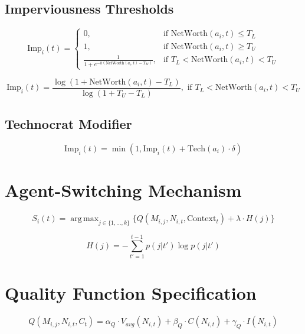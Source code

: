\documentclass[12pt, a4paper]{article}
\DeclareMathOperator*{\argmax}{arg\,max}
\begin{document}
\subsection{Imperviousness Thresholds}
\begin{equation}
\text{Imp}_i(t) = \begin{cases}
0, & \text{if } \text{NetWorth}(a_i, t) \leq T_L \\
1, & \text{if } \text{NetWorth}(a_i, t) \geq T_U \\
\frac{1}{1 + e^{-k(\text{NetWorth}(a_i, t) - T_M)}}, & \text{if } T_L < \text{NetWorth}(a_i, t) < T_U
\end{cases}
\end{equation}


\begin{equation}
\text{Imp}_i(t) = \frac{\log(1 + \text{NetWorth}(a_i, t) - T_L)}{\log(1 + T_U - T_L)}, \text{ if } T_L < \text{NetWorth}(a_i, t) < T_U
\end{equation}

\subsection{Technocrat Modifier}
\begin{equation}
\text{Imp}_i(t) = \min(1, \text{Imp}_i(t) + \text{Tech}(a_i) \cdot \delta)
\end{equation}




\section{Agent-Switching Mechanism}

\begin{equation}
S_i(t) = \argmax_{j \in \{1, \dots, k\}} \{Q(M_{i,j}, N_{i,t}, \text{Context}_t) + \lambda \cdot H(j)\}
\end{equation}

\begin{equation}
H(j) = -\sum_{t'=1}^{t-1} p(j|t') \log p(j|t')
\end{equation}

\section{Quality Function Specification}

\begin{equation}
Q(M_{i,j}, N_{i,t}, C_t) = \alpha_Q \cdot V_{avg}(N_{i,t}) + \beta_Q \cdot C(N_{i,t}) + \gamma_Q \cdot I(N_{i,t})
\end{equation}
\end{document}
